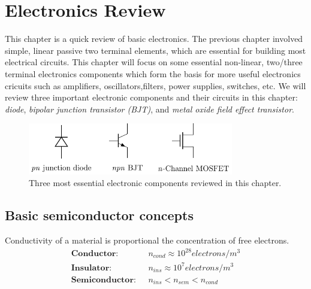 \chapter{Electronics Review}\label{chp:electronics}

This chapter is a quick review of basic electronics. The previous chapter involved simple, linear passive two terminal elements, which are essential for building most electrical circuits. This chapter will focus on some essential non-linear, two/three terminal electronics components which form the basis for more useful electronics cricuits such as amplifiers, oscillators,filters, power supplies, switches, etc. We will review three important electronic components and their circuits in this chapter: \textit{diode}, \textit{bipolar junction transistor (BJT)}, and \textit{metal oxide field effect transistor}.

\begin{figure}[b]
    \centering
    \includegraphics[width=0.8\textwidth]{figures/ch03/fig03-01.pdf}
    \caption{Three most essential electronic components reviewed in this chapter.}
    \label{fig:03-01}
\end{figure}

\section{Basic semiconductor concepts}
Conductivity of a material is proportional the concentration of free electrons.
\begin{equation}
    \begin{split}
    \textbf{Conductor: }\,\, & n_{cond} \approx 10^{28} electrons/m^3 \\
    \textbf{Insulator: }\,\, & n_{ins} \approx 10^{7} electrons/m^3 \\
    \textbf{Semiconductor: }\,\, & n_{ins} < n_{sem} < n_{cond}
    \end{split}
    \label{eq:ch03-elec-conc}
\end{equation}

